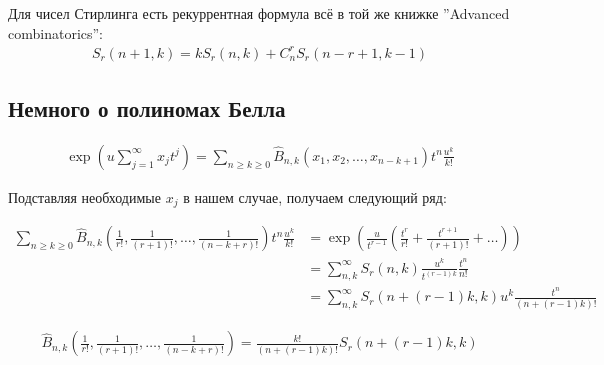 \documentclass[a4paper, 12pt]{article}
\begin{document}
Для чисел Стирлинга есть рекуррентная формула всё в той же книжке ''Advanced combinatorics'':
\begin{equation}
\begin{aligned}
    S_r(n+1, k) = k S_r(n, k) + C_n^{r} S_r(n-r+1, k-1)
\end{aligned}
\end{equation}
\subsection*{Немного о полиномах Белла}
\begin{equation}
\begin{aligned}
    \exp\left(u \sum\limits_{j=1}^{\infty}x_j t^j\right) = \sum\limits_{n\geq k\geq 0} 
    \hat{B}_{n,k}\left(x_1, x_2, \dots, x_{n-k+1}\right) t^n \frac{u^k}{k!}
\end{aligned}
\end{equation}

Подставляя необходимые $x_j$ в нашем случае, получаем следующий ряд:

\begin{equation}
\begin{aligned}
    \sum\limits_{n\geq k\geq 0} 
    \hat{B}_{n, k}\left(\frac{1}{r!}, \frac{1}{(r+1)!}, \dots, \frac{1}{(n-k+r)!}\right) t^n \frac{u^k}{k!} &= 
    \exp\left(\frac{u}{t^{r-1}} \left(\frac{t^r}{r!} + \frac{t^{r+1}}{(r+1)!}+\dots \right)\right) \\ 
    &= \sum\limits_{n, k}^{\infty} S_{r}(n, k) \frac{u^k}{t^{(r-1)k}}\frac{t^n}{n!} \\
    &= \sum\limits_{n, k}^{\infty} S_{r}(n+(r-1)k, k) u^k\frac{t^n}{(n+(r-1)k)!}
\end{aligned}
\end{equation}


\begin{equation}
\begin{aligned}
    \hat{B}_{n, k}\left(\frac{1}{r!}, \frac{1}{(r+1)!}, \dots, \frac{1}{(n-k+r)!}\right) = 
    \frac{k!}{(n+(r-1)k)!}S_{r}(n+(r-1)k, k)
\end{aligned}
\end{equation}
\end{document}
